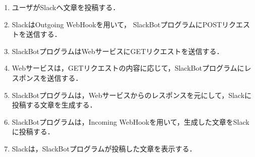 \documentclass[12pt]{jsarticle}
\begin{document}
\begin{enumerate}
\item ユーザがSlackへ文章を投稿する．
\item SlackはOutgoing WebHookを用いて，%
  SlackBotプログラムにPOSTリクエストを送信する．
\item\label{enum:request} SlackBotプログラムはWebサービスにGETリクエストを送信する．
\item\label{enum:response} Webサービスは，GETリクエストの内容に応じて，SlackBotプログラムにレスポンスを送信する．
\item SlackBotプログラムは，Webサービスからのレスポンスを元にして，Slackに投稿する文章を生成する．
\item SlackBotプログラムは，Incoming WebHookを用いて，生成した文章をSlackに投稿する．
\item Slackは，SlackBotプログラムが投稿した文章を表示する．
\end{enumerate}

\end{document}
